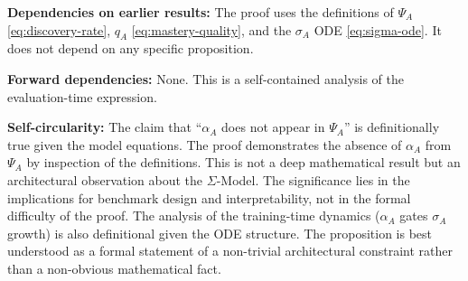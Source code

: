 \begin{circularity-check}
\textbf{Dependencies on earlier results:} The proof uses the
definitions of $\Psi_A$ \eqref{eq:discovery-rate},
$q_A$ \eqref{eq:mastery-quality}, and the $\sigma_A$ ODE
\eqref{eq:sigma-ode}. It does not depend on any specific proposition.

\textbf{Forward dependencies:} None. This is a self-contained
analysis of the evaluation-time expression.

\textbf{Self-circularity:} The claim that ``$\alpha_A$ does not
appear in $\Psi_A$'' is definitionally true given the model equations.
The proof demonstrates the absence of $\alpha_A$ from $\Psi_A$ by
inspection of the definitions. This is not a deep mathematical
result but an architectural observation about the $\Sigma$-Model.
The significance lies in the implications for benchmark design and
interpretability, not in the formal difficulty of the proof. The
analysis of the training-time dynamics ($\alpha_A$ gates $\sigma_A$
growth) is also definitional given the ODE structure. The proposition
is best understood as a formal statement of a non-trivial architectural
constraint rather than a non-obvious mathematical fact.
\end{circularity-check}
